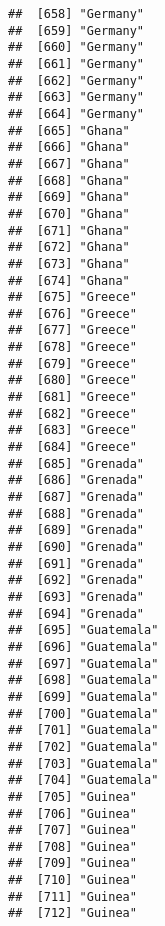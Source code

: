 \documentclass[]{article}
\begin{document}
\begin{verbatim}
##  [658] "Germany"                            
##  [659] "Germany"                            
##  [660] "Germany"                            
##  [661] "Germany"                            
##  [662] "Germany"                            
##  [663] "Germany"                            
##  [664] "Germany"                            
##  [665] "Ghana"                              
##  [666] "Ghana"                              
##  [667] "Ghana"                              
##  [668] "Ghana"                              
##  [669] "Ghana"                              
##  [670] "Ghana"                              
##  [671] "Ghana"                              
##  [672] "Ghana"                              
##  [673] "Ghana"                              
##  [674] "Ghana"                              
##  [675] "Greece"                             
##  [676] "Greece"                             
##  [677] "Greece"                             
##  [678] "Greece"                             
##  [679] "Greece"                             
##  [680] "Greece"                             
##  [681] "Greece"                             
##  [682] "Greece"                             
##  [683] "Greece"                             
##  [684] "Greece"                             
##  [685] "Grenada"                            
##  [686] "Grenada"                            
##  [687] "Grenada"                            
##  [688] "Grenada"                            
##  [689] "Grenada"                            
##  [690] "Grenada"                            
##  [691] "Grenada"                            
##  [692] "Grenada"                            
##  [693] "Grenada"                            
##  [694] "Grenada"                            
##  [695] "Guatemala"                          
##  [696] "Guatemala"                          
##  [697] "Guatemala"                          
##  [698] "Guatemala"                          
##  [699] "Guatemala"                          
##  [700] "Guatemala"                          
##  [701] "Guatemala"                          
##  [702] "Guatemala"                          
##  [703] "Guatemala"                          
##  [704] "Guatemala"                          
##  [705] "Guinea"                             
##  [706] "Guinea"                             
##  [707] "Guinea"                             
##  [708] "Guinea"                             
##  [709] "Guinea"                             
##  [710] "Guinea"                             
##  [711] "Guinea"                             
##  [712] "Guinea"                             

\end{verbatim}
\end{document}
